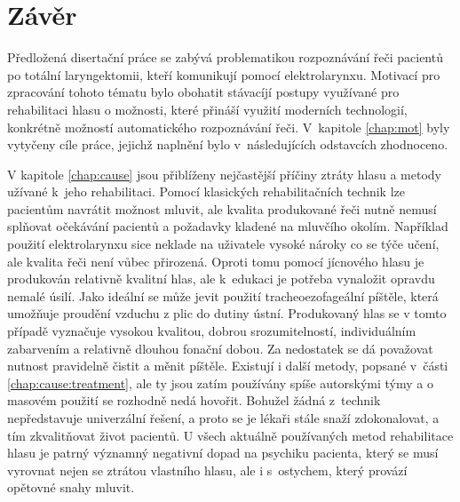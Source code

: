 \chapter*{Závěr}
\label{chap:conclusion}

Předložená disertační práce se zabývá problematikou rozpoznávání řeči pacientů po totální laryngektomii, kteří komunikují pomocí elektrolarynxu. Motivací pro zpracování tohoto tématu bylo obohatit stávacíjí postupy využívané pro rehabilitaci hlasu o možnosti, které přináší využití moderních technologií, konkrétně možností automatického rozpoznávání řeči. V~kapitole \ref{chap:mot} byly vytyčeny cíle práce, jejichž naplnění bylo v~následujících odstavcích zhodnoceno.

V kapitole \ref{chap:cause} jsou přiblíženy nejčastější příčiny ztráty hlasu a metody užívané k~jeho rehabilitaci.
Pomocí klasických rehabilitačních technik lze pacientům navrátit možnost mluvit, ale kvalita produkované řeči nutně nemusí splňovat očekávání pacientů  a požadavky kladené na mluvčího okolím. Například použití
elektrolarynxu sice neklade na uživatele vysoké nároky co se týče učení, ale
kvalita řeči není vůbec přirozená. Oproti tomu pomocí jícnového hlasu je
produkován relativně kvalitní hlas, ale k~edukaci je potřeba vynaložit opravdu
nemalé úsilí. Jako ideální se může jevit použití tracheoezofageální píštěle,
která umožňuje proudění vzduchu z plic do dutiny ústní. Produkovaný hlas se v
tomto případě vyznačuje vysokou kvalitou, dobrou srozumitelností,
individuálním zabarvením a relativně dlouhou fonační dobou. Za nedostatek se
dá považovat nutnost pravidelně čistit a měnit píštěle. Existují i další
metody, popsané v~části \ref{chap:cause:treatment}, ale ty jsou zatím používány
spíše autorskými týmy a o masovém použití se rozhodně nedá hovořit. Bohužel
žádná z~technik nepředstavuje univerzální řešení, a proto se je lékaři
stále snaží zdokonalovat, a tím zkvalitňovat život pacientů. U všech aktuálně používaných metod rehabilitace hlasu
je patrný významný negativní dopad na psychiku pacienta, který se musí vyrovnat nejen se ztrátou vlastního hlasu, ale i s~ostychem, který provází opětovné snahy mluvit.

